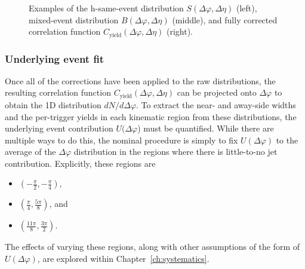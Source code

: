 \begin{figure}[t]
\caption{Examples of the h-\lmb same-event distribution $S(\Delta\varphi, \Delta\eta)$ (left), mixed-event distribution $B(\Delta\varphi, \Delta\eta)$ (middle), and fully corrected correlation function $C_{\text{yield}}(\Delta\varphi, \Delta\eta)$ (right).}
\label{fig:twod_cor}
\end{figure}

\clearpage

\subsubsection{Underlying event fit}
\label{sec:uefit}

Once all of the corrections have been applied to the raw distributions, the resulting correlation function $C_{\text{yield}}(\Delta\varphi, \Delta\eta)$ can be projected onto $\Delta\varphi$ to obtain the 1D distribution $dN/d\Delta\varphi$. To extract the near- and away-side widths and the per-trigger yields in each kinematic region from these distributions, the underlying event contribution $U(\Delta\varphi$) must be quantified. While there are multiple ways to do this, the nominal procedure is simply to fix $U(\Delta\varphi)$ to the average of the $\Delta\varphi$ distribution in the regions where there is little-to-no jet contribution. Explicitly, these regions are 
\begin{itemize}
\item $(-\frac{\pi}{2}, -\frac{\pi}{4})$, 
\item $(\frac{\pi}{4}, \frac{5\pi}{8})$, and
\item $(\frac{11\pi}{8}, \frac{3\pi}{2})$. 
\end{itemize}
The effects of varying these regions, along with other assumptions of the form of $U(\Delta\varphi)$, are explored within Chapter~\ref{ch:systematics}.

